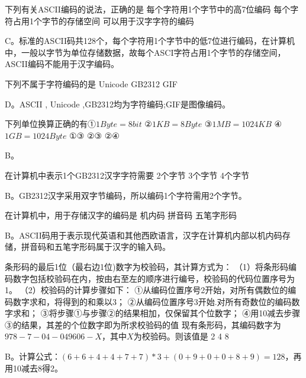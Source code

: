 \begin{groups}


\begin{questions}[rp]

\question
{}下列有关ASCII编码的说法，正确的是
{每个字符用1个字节中的高7位编码}
{每个字符占用1个字节的存储空间}
{可以用于汉字字符的编码}
\begin{solution}
C。标准的ASCII码共128个，每个字符用1个字节中的低7位进行编码，在计算机中，一般以字节为单位存储数据，故每个ASCI字符占用1个字节的存储空间，ASCII编码不能用于汉字编码。
\end{solution}

\question
{}下列不属于字符编码的是
{Unicode}
{GB2312}
{GIF}
\begin{solution}
D。ASCII , Unicode ,GB2312均为字符编码;GIF是图像编码。
\end{solution}

\question
{}下列单位换算正确的有①$1Byte=8bit$ ②$1KB=8Byte$ ③$1MB=1024KB$ ④$1GB=1024Byte$
{①③}
{②③}
{②④}
\begin{solution}
B。
\end{solution}

\question
{}在计算机中表示1个GB2312汉字字符需要
{2个字节}
{3个字节}
{4个字节}
\begin{solution}
B。GB2312汉字采用双字节编码，所以编码1个字符需用2个字节。
\end{solution}

\question
{}在计算机中，用于存储汉字的编码是
{机内码}
{拼音码}
{五笔字形码}
\begin{solution}
B。ASCII码用于表示现代英语和其他西欧语言，汉字在计算机内部以机内码存储，拼音码和五笔字形码属于汉字的输入码。
\end{solution}

\question
{}条形码的最后1位（最右边1位)数字为校验码，其计算方式为：
（1）将条形码编码数字包括校验码在内，按由右至左的顺序进行编号，校验码的代码位置序号为1。
（2）校验码的计算步骤如下：
①从编码位置序号2开始，对所有偶数位的编码数字求和，将得到的和乘以3；
②从编码位置序号3开始.对所有奇数位的编码数字求和；
③将步骤①与步骤②的结果相加，仅保留其个位数字；
④用10减去步骤③的结果，其差的个位数字即为所求校验码的值
现有条形码，其编码数字为$978-7-04-049606-X$，其中$X$为校验码。则该值是
{2}
{4}
{8}
\begin{solution}
B。计算公式：$(6+6+4+4+7+7)*3+(0+9+0+0+8+9)=128$，再用10减去8得2。
\end{solution}


\end{questions}
\end{groups}
